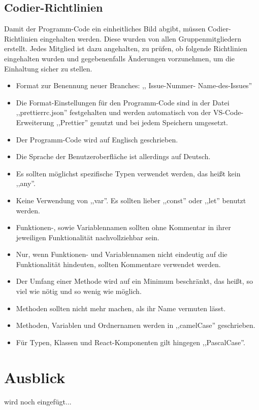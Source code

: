\documentclass[conference]{IEEEtran}
\begin{document}
\subsection{Codier-Richtlinien}
Damit der Programm-Code ein einheitliches Bild abgibt, müssen Codier-Richtlinien eingehalten werden. Diese wurden von allen Gruppenmitgliedern erstellt.
Jedes Mitglied ist dazu angehalten, zu prüfen, ob folgende Richtlinien eingehalten wurden und gegebenenfalls Änderungen vorzunehmen, um die Einhaltung sicher zu stellen.
\begin{itemize}
    \item Format zur Benennung neuer \gls{Branches}: ,, \textlangle \gls{Issue}-Nummer\textrangle- \textlangle Name-des-Issues\textrangle''
    \item Die Format-Einstellungen für den Programm-Code sind in der Datei ,,prettierrc.json'' festgehalten und werden automatisch von der \gls{VS-Code}-Erweiterung ,,\gls{Prettier}'' genutzt und bei jedem Speichern umgesetzt.
    \item Der Programm-Code wird auf Englisch geschrieben.
    \item Die Sprache der Benutzeroberfläche ist allerdings auf Deutsch.
    \item Es sollten möglichst spezifische Typen verwendet werden, das heißt kein ,,any''.
    \item Keine Verwendung von ,,var''. Es sollten lieber ,,const'' oder ,,let'' benutzt werden.
    \item Funktionen-, sowie Variablennamen sollten ohne Kommentar in ihrer jeweiligen Funktionalität nachvollziehbar sein.
    \item Nur, wenn Funktionen- und Variablennamen nicht eindeutig auf die Funktionalität hindeuten, sollten Kommentare verwendet werden.
    \item Der Umfang einer Methode wird auf ein Minimum beschränkt, das heißt, so viel wie nötig und so wenig wie möglich.
    \item Methoden sollten nicht mehr machen, als ihr Name vermuten lässt.
    \item Methoden, Variablen und Ordnernamen werden in ,,\gls{camelCase}'' geschrieben.
    \item Für Typen, Klassen und React-Komponenten gilt hingegen ,,\gls{PascalCase}''.
\end{itemize}

\section{Ausblick}
wird noch eingefügt...

\printglossary[style=altlist,title=Glossar]
\vspace{12pt}
\end{document}
